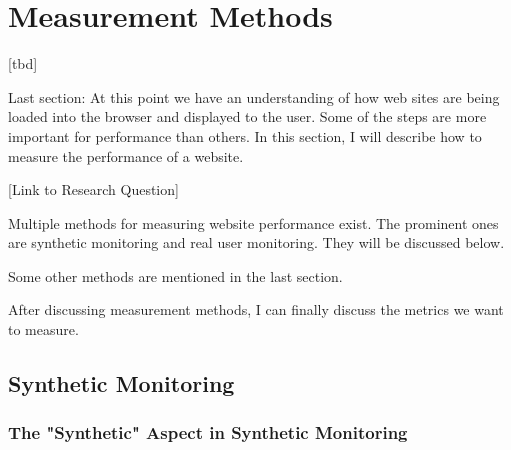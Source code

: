 


\section{Measurement Methods}


[tbd]



Last section: At this point we have an understanding of how web sites are being loaded into the browser and displayed to the user.
Some of the steps are more important for performance than others.
In this section, I will describe how to measure the performance of a website.


[Link to Research Question]




Multiple methods for measuring website performance exist.
The prominent ones are synthetic monitoring and real user monitoring.
They will be discussed below.

Some other methods are mentioned in the last section.

After discussing measurement methods, I can finally discuss the metrics we want to measure.







\subsection{Synthetic Monitoring}


\subsubsection{The "Synthetic" Aspect in Synthetic Monitoring}


